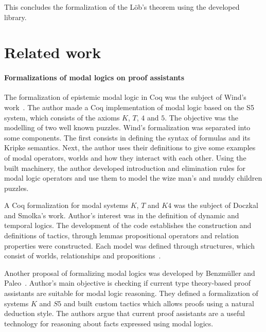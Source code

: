 \documentclass[sigconf]{acmart}
\begin{document}
This concludes the formalization of the L\"ob's theorem using
the developed library.

\section{Related work}\label{sec:related}

\paragraph{Formalizations of modal logics on proof assistants}

The formalization of epistemic modal logic in Coq was the subject of Wind's
work~\cite{dewind}.
The author made a Coq implementation of modal logic based on the S5 system,
which consists of  the axioms $K$, $T$, $4$ and $5$. The objective was the
modelling of two well known puzzles.
Wind's formalization was separated into some components. The first consists in
defining the syntax of formulas and its Kripke semantics. Next, the author uses
their definitions to give some examples of modal operators, worlds and how they
interact with each other. Using the built machinery, the author developed
introduction and elimination rules for modal logic operators and use them to
model the wize man's and muddy children puzzles.

A Coq formalization for modal systems $K$, $T$ and $K4$ was the subject of 
Doczkal and Smolka's work. Author's interest was in the definition of dynamic
and temporal logics. The development of the code establishes the construction
and definitions of tactics, through lemmas propositional operators and relation
properties were constructed. Each model was defined through structures, which
consist of worlds, relationships and propositions~\cite{saarland}.

Another proposal of formalizing modal logics was developed by Benzmüller and
Paleo~\cite{Chris_Bruno}. Author's main objective is checking if current
type theory-based proof assistants are suitable for modal logic reasoning.
They defined a formalization of systems $K$ and $S5$ and built custom tactics
which allows proofs using a natural deduction style.
The authors argue that current proof assistants are a useful technology for
reasoning about facts expressed using modal logics. 
\end{document}
